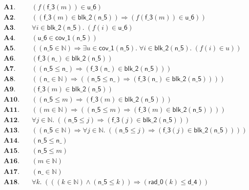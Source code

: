 \documentclass[11pt]{article}
\begin{document}
\begin{align*}
  \mathbf{A1.}\quad & (f(\mathsf{f\_3}(m)) \in \mathsf{u\_6}) \\
  \mathbf{A2.}\quad & ((\mathsf{f\_3}(m) \in \mathsf{blk\_2}(\mathsf{n\_5})) \Rightarrow (f(\mathsf{f\_3}(m)) \in \mathsf{u\_6})) \\
  \mathbf{A3.}\quad & \forall i \in \mathsf{blk\_2}(\mathsf{n\_5}).\; (f(i) \in \mathsf{u\_6}) \\
  \mathbf{A4.}\quad & (\mathsf{u\_6} \in \mathsf{cov\_1}(\mathsf{n\_5})) \\
  \mathbf{A5.}\quad & ((\mathsf{n\_5} \in \mathbb{N}) \Rightarrow \exists u \in \mathsf{cov\_1}(\mathsf{n\_5}).\; \forall i \in \mathsf{blk\_2}(\mathsf{n\_5}).\; (f(i) \in u)) \\
  \mathbf{A6.}\quad & (\mathsf{f\_3}(\mathsf{n\_}) \in \mathsf{blk\_2}(\mathsf{n\_5})) \\
  \mathbf{A7.}\quad & ((\mathsf{n\_5} \leq \mathsf{n\_}) \Rightarrow (\mathsf{f\_3}(\mathsf{n\_}) \in \mathsf{blk\_2}(\mathsf{n\_5}))) \\
  \mathbf{A8.}\quad & ((\mathsf{n\_} \in \mathbb{N}) \Rightarrow ((\mathsf{n\_5} \leq \mathsf{n\_}) \Rightarrow (\mathsf{f\_3}(\mathsf{n\_}) \in \mathsf{blk\_2}(\mathsf{n\_5})))) \\
  \mathbf{A9.}\quad & (\mathsf{f\_3}(m) \in \mathsf{blk\_2}(\mathsf{n\_5})) \\
  \mathbf{A10.}\quad & ((\mathsf{n\_5} \leq m) \Rightarrow (\mathsf{f\_3}(m) \in \mathsf{blk\_2}(\mathsf{n\_5}))) \\
  \mathbf{A11.}\quad & ((m \in \mathbb{N}) \Rightarrow ((\mathsf{n\_5} \leq m) \Rightarrow (\mathsf{f\_3}(m) \in \mathsf{blk\_2}(\mathsf{n\_5})))) \\
  \mathbf{A12.}\quad & \forall j \in \mathbb{N}.\; ((\mathsf{n\_5} \leq j) \Rightarrow (\mathsf{f\_3}(j) \in \mathsf{blk\_2}(\mathsf{n\_5}))) \\
  \mathbf{A13.}\quad & ((\mathsf{n\_5} \in \mathbb{N}) \Rightarrow \forall j \in \mathbb{N}.\; ((\mathsf{n\_5} \leq j) \Rightarrow (\mathsf{f\_3}(j) \in \mathsf{blk\_2}(\mathsf{n\_5})))) \\
  \mathbf{A14.}\quad & (\mathsf{n\_5} \leq \mathsf{n\_}) \\
  \mathbf{A15.}\quad & (\mathsf{n\_5} \leq m) \\
  \mathbf{A16.}\quad & (m \in \mathbb{N}) \\
  \mathbf{A17.}\quad & (\mathsf{n\_} \in \mathbb{N}) \\
  \mathbf{A18.}\quad & \forall k.\; (((k \in \mathbb{N}) \wedge (\mathsf{n\_5} \leq k)) \Rightarrow (\mathsf{rad\_0}(k) \leq \mathsf{d\_4})) \\

\end{align*}
\end{document}
